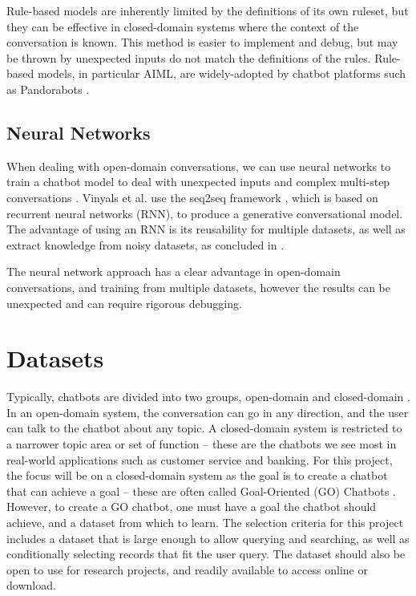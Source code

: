 Rule-based models are inherently limited by the definitions of its own ruleset, but they can be effective in closed-domain systems where the context of the conversation is known. This method is easier to implement and debug, but may be thrown by unexpected inputs do not match the definitions of the rules. Rule-based models, in particular AIML, are widely-adopted by chatbot platforms such as Pandorabots \cite{pandorabots2019about}.

\subsection{Neural Networks}
When dealing with open-domain conversations, we can use neural networks to train a chatbot model to deal with unexpected inputs and complex multi-step conversations \cite{vinyals2015neural}. Vinyals et al. use the seq2seq framework \cite{sutskever2014sequence}, which is based on recurrent neural networks (RNN), to produce a generative conversational model. The advantage of using an RNN is its reusability for multiple datasets, as well as extract knowledge from noisy datasets, as concluded in \cite{vinyals2015neural}.


The neural network approach has a clear advantage in open-domain conversations, and training from multiple datasets, however the results can be unexpected and can require rigorous debugging.

\cleardoublepage
\section{Datasets}
Typically, chatbots are divided into two groups, open-domain and closed-domain \cite{ilievski2018building}. In an open-domain system, the conversation can go in any direction, and the user can talk to the chatbot about any topic. A closed-domain system is restricted to a narrower topic area or set of function – these are the chatbots we see most in real-world applications such as customer service and banking. For this project, the focus will be on a closed-domain system as the goal is to create a chatbot that can achieve a goal – these are often called Goal-Oriented (GO) Chatbots \cite{ilievski2018building}. However, to create a GO chatbot, one must have a goal the chatbot should achieve, and a dataset from which to learn. The selection criteria for this project includes a dataset that is large enough to allow querying and searching, as well as conditionally selecting records that fit the user query. The dataset should also be open to use for research projects, and readily available to access online or download.


